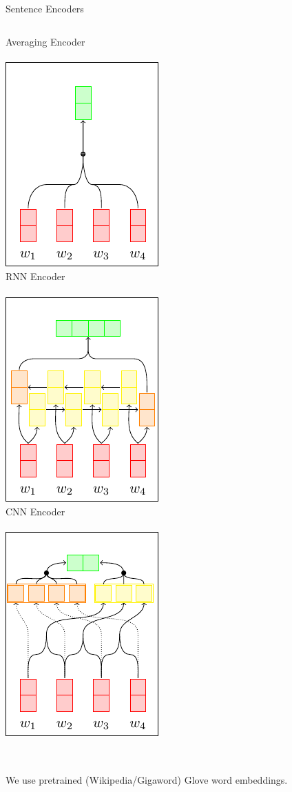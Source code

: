 \begin{frame}{Sentence Encoders}
 \begin{columns}[t]
   \centering
   Averaging Encoder\\~\\
   \includegraphics[]{images/section3/avg_encoder.pdf}\\
   \centering
   RNN Encoder\\~\\
   \includegraphics[]{images/section3/rnn_encoder.pdf}\\
   \centering
   CNN Encoder\\~\\
   \includegraphics[]{images/section3/cnn_encoder.pdf}\\
 \end{columns}

~\\
We use pretrained (Wikipedia/Gigaword) Glove word embeddings.

\end{frame}
